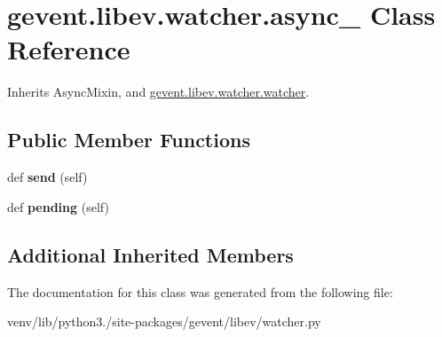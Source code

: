 \hypertarget{classgevent_1_1libev_1_1watcher_1_1async__}{}\section{gevent.\+libev.\+watcher.\+async\+\_\+ Class Reference}
\label{classgevent_1_1libev_1_1watcher_1_1async__}


Inherits Async\+Mixin, and \hyperlink{classgevent_1_1libev_1_1watcher_1_1watcher}{gevent.\+libev.\+watcher.\+watcher}.

\subsection*{Public Member Functions}
\begin{DoxyCompactItemize}
\item 
\mbox{\label{classgevent_1_1libev_1_1watcher_1_1async___aae40f6a351222e58b2a24641868a38f6}} 
def {\bfseries send} (self)
\item 
\mbox{\label{classgevent_1_1libev_1_1watcher_1_1async___a79d2a7b659862ee91fc1ada19a2b479c}} 
def {\bfseries pending} (self)
\end{DoxyCompactItemize}
\subsection*{Additional Inherited Members}


The documentation for this class was generated from the following file\+:\begin{DoxyCompactItemize}
\item 
venv/lib/python3./site-\/packages/gevent/libev/watcher.\+py\end{DoxyCompactItemize}
